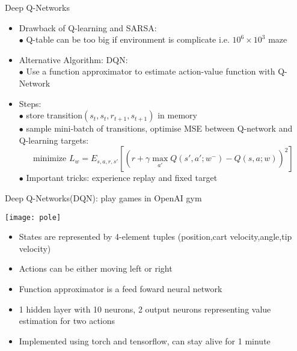 \begin{frame}{Deep Q-Networks}
    \begin{itemize}
         \item Drawback of Q-learning and SARSA:\\
         \bigskip
         \hspace{0.5cm}$\bullet$ Q-table can be too big if environment is complicate i.e. $10^6\times10^3$ maze\\
         \bigskip
         \item Alternative Algorithm: DQN:\\
         \bigskip
         \hspace{0.5cm}$\bullet$ Use a function approximator to estimate action-value function with Q-Network\\
         \bigskip
         \item Steps:\\
         \bigskip
         \hspace{0.5cm}$\bullet$ store transition$(s_{t},s_{t},r_{t+1},s_{t+1})$ in memory\\
         \hspace{0.5cm}$\bullet$ sample mini-batch of transitions, optimise MSE between Q-network and \\
         \hspace{0.7cm} Q-learning targets:\\
         \begin{equation}
            \text{minimize  }  L_{w}=E_{s,a,r,s'}[(r+\gamma \max\limits_{a'}Q(s',a';w^{-})-Q(s,a;w))^2]
        \end{equation}
        \hspace{0.5cm}$\bullet$ Important tricks: experience replay and fixed target

    \end{itemize}
\end{frame}


\begin{frame}{Deep Q-Networks(DQN): play games in OpenAI gym}
    \begin{center}\texttt{[image: pole]}\end{center}
    \begin{itemize}
        \item States are represented by 4-element tuples (position,cart velocity,angle,tip velocity)
        \item Actions can be either moving left or right
        \item Function approximator is a feed foward neural network 
        \item 1 hidden layer with 10 neurons, 2 output neurons representing value estimation for two actions
        \item Implemented using torch and tensorflow, can stay alive for 1 minute
    \end{itemize}

\end{frame}







